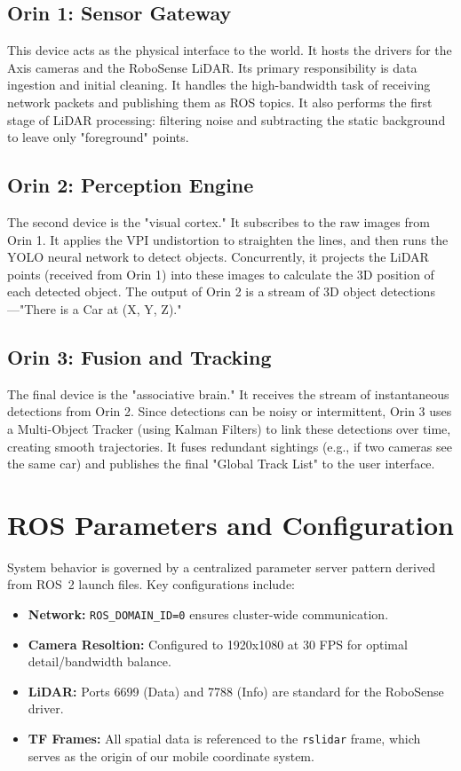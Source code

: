 \documentclass[12pt,a4paper]{report}
\begin{document}
\subsection{Orin 1: Sensor Gateway}
This device acts as the physical interface to the world. It hosts the drivers for the Axis cameras and the RoboSense LiDAR. Its primary responsibility is data ingestion and initial cleaning. It handles the high-bandwidth task of receiving network packets and publishing them as ROS topics. It also performs the first stage of LiDAR processing: filtering noise and subtracting the static background to leave only "foreground" points.

\subsection{Orin 2: Perception Engine}
The second device is the "visual cortex." It subscribes to the raw images from Orin 1. It applies the VPI undistortion to straighten the lines, and then runs the YOLO neural network to detect objects. Concurrently, it projects the LiDAR points (received from Orin 1) into these images to calculate the 3D position of each detected object. The output of Orin 2 is a stream of 3D object detections—"There is a Car at (X, Y, Z)."

\subsection{Orin 3: Fusion and Tracking}
The final device is the "associative brain." It receives the stream of instantaneous detections from Orin 2. Since detections can be noisy or intermittent, Orin 3 uses a Multi-Object Tracker (using Kalman Filters) to link these detections over time, creating smooth trajectories. It fuses redundant sightings (e.g., if two cameras see the same car) and publishes the final "Global Track List" to the user interface.

\section{ROS Parameters and Configuration}
System behavior is governed by a centralized parameter server pattern derived from ROS~2 launch files. Key configurations include:
\begin{itemize}
    \item \textbf{Network:} \texttt{ROS\_DOMAIN\_ID=0} ensures cluster-wide communication.
    \item \textbf{Camera Resoltion:} Configured to 1920x1080 at 30 FPS for optimal detail/bandwidth balance.
    \item \textbf{LiDAR:} Ports 6699 (Data) and 7788 (Info) are standard for the RoboSense driver.
    \item \textbf{TF Frames:} All spatial data is referenced to the \texttt{rslidar} frame, which serves as the origin of our mobile coordinate system.
\end{itemize}
\end{document}
